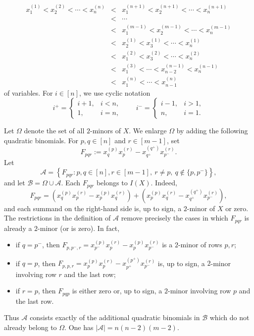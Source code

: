 \documentclass[12pt]{amsart}
\numberwithin{equation}{section}
\newcommand{\Bc}{\mathcal{B}}
\begin{document}
\begin{eqnarray*}
x_{1}^{(1)}< x_{2}^{(2)} < \cdots < x_{n}^{(n)} & < & x_1^{(n+1)} < x_2^{(n+1)} < \cdots < x_n^{(n+1)} \\
& < & \cdots
\\
& < & x_1^{(m-1)} < x_2^{(m-1)} < \cdots < x_n^{(m-1)} 
\\ & < &
x_2^{(1)} < x_3^{(1)} < \cdots < x_n^{(1)} \\ & < & 
x_1^{(2)} < x_3^{(2)}  < \cdots < x_n^{(2)} \\ & < & 
x_1^{(3)} < \cdots < x_{n-2}^{(n-1)} < x_n^{(n-1)} \\ & < & x_1^{(n)} < \cdots < x_{n-1}^{(n)}
\end{eqnarray*}
of variables.  For $i\in[n]$, we use cyclic notation
\[
i^+=
\begin{cases}
i+1,& i<n,\\
1,& i=n,
\end{cases}
\qquad
i^-=
\begin{cases}
i-1,& i>1,\\
n,& i=1.
\end{cases}
\]

\noindent
Let $\Omega$ denote the set of all $2$-minors of $X$.  We enlarge
$\Omega$ by adding the following quadratic binomials.  For
$p,q\in[n]$ and $r \in [m-1]$, set
\[
F_{pqr}
:=
x_q^{(p)}x_p^{(r)}
-
x_{q^+}^{(q^+)}x_{p^-}^{(r)}.
\]
Let
\[
\mathcal A
=
\left\{
F_{pqr}:
p,q\in[n], r \in [m-1],\
r\neq p,\
q\notin\{p,p^-\}
\right\},
\]
and let $\Bc =\Omega\cup\mathcal A$. Each $F_{pqr}$ belongs to $I(X)$. Indeed,
\[
F_{pqr}
=
\left(
x_q^{(p)}x_p^{(r)}
-
x_p^{(p)}x_q^{(r)}
\right) +
\left(
x_p^{(p)}x_q^{(r)}
-
x_{q^+}^{(q^+)}x_{p^-}^{(r)}
\right),
\]
and each summand on the right-hand side is, up to sign,
a $2$-minor of $X$ or zero.
The restrictions in the definition of $\mathcal A$ remove precisely
the cases in which $F_{pqr}$ is already a $2$-minor (or is zero).
In fact,
\begin{itemize}
\item if $q=p^-$, then $F_{p,p^-,r}
=
x_{p^-}^{(p)}x_p^{(r)}
-
x_p^{(p)}x_{p^-}^{(r)}$ is a $2$-minor of rows $p,r$;

\item if $q=p$, then $F_{p,p,r}
=
x_p^{(p)}x_p^{(r)}
-
x_{p^+}^{(p^+)}x_{p^-}^{(r)}$ is, up to sign, a $2$-minor involving row $r$ and the last row;

\item if $r=p$, then $F_{pqp}$ is either zero or, up to sign,
a $2$-minor involving row $p$ and the last row.
\end{itemize}
% 
Thus $\mathcal A$ consists exactly of the additional quadratic
binomials in $\Bc$ which do not already belong to $\Omega$.
One has $|\mathcal A|=n(n-2)(m-2).$
\end{document}
